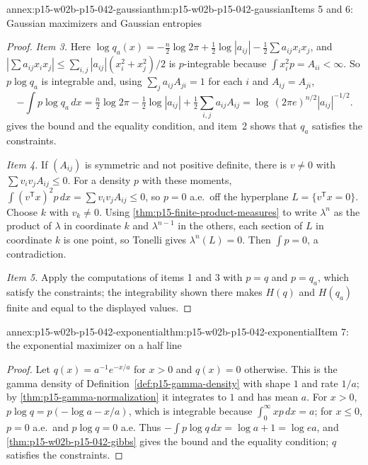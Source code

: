 \begin{annexitem}{annex:p15-w02b-p15-042-gaussian}{thm:p15-w02b-p15-042-gaussian}{Items 5 and 6: Gaussian maximizers and Gaussian entropies}
\begin{proof}
\emph{Item 3.} Here
\(\log q_a(x)=-\tfrac n2\log2\pi+\tfrac12\log|a_{ij}|
 -\tfrac12\sum a_{ij}x_ix_j\), and
\(|\sum a_{ij}x_ix_j|\leq\sum_{i,j}|a_{ij}|(x_i^2+x_j^2)/2\) is
\(p\)-integrable because \(\int x_i^2p=A_{ii}<\infty\). So \(p\log q_a\) is
integrable and, using \(\sum_ja_{ij}A_{ji}=1\) for each \(i\) and
\(A_{ij}=A_{ji}\),
\[
 -\int p\log q_a\,dx=\tfrac n2\log2\pi-\tfrac12\log|a_{ij}|
    +\tfrac12\sum_{i,j}a_{ij}A_{ij}
   =\log\,(2\pi e)^{n/2}|a_{ij}|^{-1/2}.
\]
 gives the bound and the equality condition,
and item~2 shows that \(q_a\) satisfies the constraints.

\emph{Item 4.} If \((A_{ij})\) is symmetric and not positive definite, there
is \(v\neq0\) with \(\sum v_iv_jA_{ij}\leq0\). For a density \(p\) with
these moments, \(\int(v^{\mathsf T}x)^2p\,dx=\sum v_iv_jA_{ij}\leq0\), so
\(p=0\) a.e.\ off the hyperplane \(L=\{v^{\mathsf T}x=0\}\). Choose \(k\) with
\(v_k\neq0\). Using \cref{thm:p15-finite-product-measures} to write
\(\lambda^n\) as the product of \(\lambda\) in coordinate \(k\) and
\(\lambda^{n-1}\) in the others, each section of \(L\) in coordinate \(k\) is
one point, so Tonelli gives \(\lambda^n(L)=0\). Then \(\int p=0\), a
contradiction.

\emph{Item 5.} Apply the computations of items 1 and 3 with \(p=q\) and
\(p=q_a\), which satisfy the constraints; the integrability shown there makes
\(H(q)\) and \(H(q_a)\) finite and equal to the displayed values.
\end{proof}
\end{annexitem}

\begin{annexitem}{annex:p15-w02b-p15-042-exponential}{thm:p15-w02b-p15-042-exponential}{Item 7: the exponential maximizer on a half line}
\begin{proof}
Let \(q(x)=a^{-1}e^{-x/a}\) for \(x>0\) and \(q(x)=0\) otherwise. This is the
gamma density of Definition~\ref{def:p15-gamma-density} with shape \(1\) and
rate \(1/a\); by \cref{thm:p15-gamma-normalization} it integrates to \(1\)
and has mean \(a\). For \(x>0\), \(p\log q=p(-\log a-x/a)\), which is
integrable because \(\int_0^\infty xp\,dx=a\); for \(x\leq0\), \(p=0\) a.e.\
and \(p\log q=0\) a.e. Thus \(-\int p\log q\,dx=\log a+1=\log ea\), and
\cref{thm:p15-w02b-p15-042-gibbs} gives the bound and the equality condition;
\(q\) satisfies the constraints.
\end{proof}
\end{annexitem}

